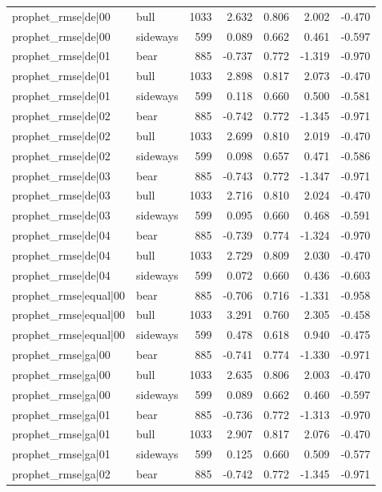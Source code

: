 \begin{table}
\begin{tabular}{llrrrrr}
prophet\_rmse|de|00 & bull & 1033 & 2.632 & 0.806 & 2.002 & -0.470 \\
prophet\_rmse|de|00 & sideways & 599 & 0.089 & 0.662 & 0.461 & -0.597 \\
prophet\_rmse|de|01 & bear & 885 & -0.737 & 0.772 & -1.319 & -0.970 \\
prophet\_rmse|de|01 & bull & 1033 & 2.898 & 0.817 & 2.073 & -0.470 \\
prophet\_rmse|de|01 & sideways & 599 & 0.118 & 0.660 & 0.500 & -0.581 \\
prophet\_rmse|de|02 & bear & 885 & -0.742 & 0.772 & -1.345 & -0.971 \\
prophet\_rmse|de|02 & bull & 1033 & 2.699 & 0.810 & 2.019 & -0.470 \\
prophet\_rmse|de|02 & sideways & 599 & 0.098 & 0.657 & 0.471 & -0.586 \\
prophet\_rmse|de|03 & bear & 885 & -0.743 & 0.772 & -1.347 & -0.971 \\
prophet\_rmse|de|03 & bull & 1033 & 2.716 & 0.810 & 2.024 & -0.470 \\
prophet\_rmse|de|03 & sideways & 599 & 0.095 & 0.660 & 0.468 & -0.591 \\
prophet\_rmse|de|04 & bear & 885 & -0.739 & 0.774 & -1.324 & -0.970 \\
prophet\_rmse|de|04 & bull & 1033 & 2.729 & 0.809 & 2.030 & -0.470 \\
prophet\_rmse|de|04 & sideways & 599 & 0.072 & 0.660 & 0.436 & -0.603 \\
prophet\_rmse|equal|00 & bear & 885 & -0.706 & 0.716 & -1.331 & -0.958 \\
prophet\_rmse|equal|00 & bull & 1033 & 3.291 & 0.760 & 2.305 & -0.458 \\
prophet\_rmse|equal|00 & sideways & 599 & 0.478 & 0.618 & 0.940 & -0.475 \\
prophet\_rmse|ga|00 & bear & 885 & -0.741 & 0.774 & -1.330 & -0.971 \\
prophet\_rmse|ga|00 & bull & 1033 & 2.635 & 0.806 & 2.003 & -0.470 \\
prophet\_rmse|ga|00 & sideways & 599 & 0.089 & 0.662 & 0.460 & -0.597 \\
prophet\_rmse|ga|01 & bear & 885 & -0.736 & 0.772 & -1.313 & -0.970 \\
prophet\_rmse|ga|01 & bull & 1033 & 2.907 & 0.817 & 2.076 & -0.470 \\
prophet\_rmse|ga|01 & sideways & 599 & 0.125 & 0.660 & 0.509 & -0.577 \\
prophet\_rmse|ga|02 & bear & 885 & -0.742 & 0.772 & -1.345 & -0.971 \\

\end{tabular}
\end{table}
